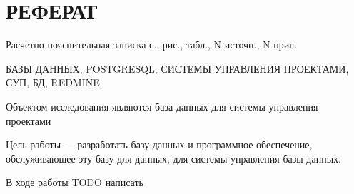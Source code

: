 \section*{РЕФЕРАТ}

Расчетно-пояснительная записка \pageref{LastPage} с.,  рис.,  табл., N источн., N прил.

БАЗЫ ДАННЫХ, POSTGRESQL, СИСТЕМЫ УПРАВЛЕНИЯ ПРОЕКТАМИ, СУП, БД, REDMINE 

Объектом исследования являются база данных для системы управления проектами

Цель работы --- разработать базу данных и программное обеспечение, обслуживающее эту базу для данных, для системы управления базы данных.

В ходе работы TODO написать
